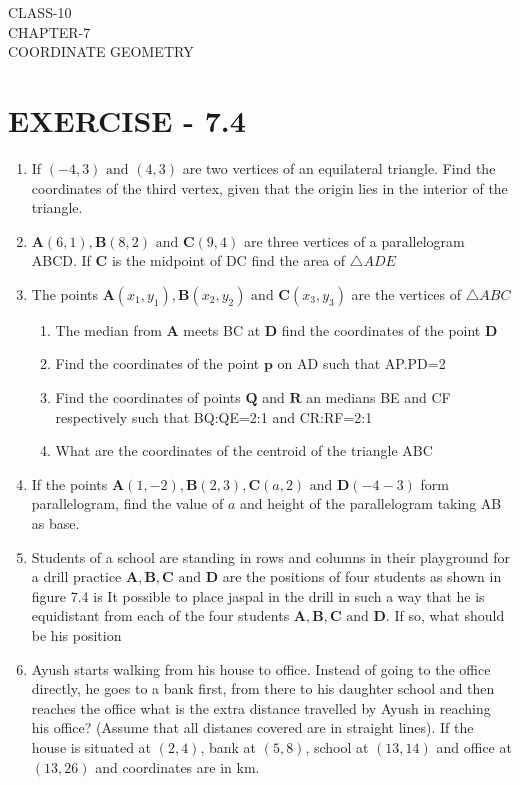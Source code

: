 \documentclass[12pt]{article}
\let\vec\mathbf
\begin{document}
\begin{center}
\textbf\large{CLASS-10\\CHAPTER-7 \\ COORDINATE GEOMETRY}
\end{center}

\section*{EXERCISE - 7.4}

\begin{enumerate}
\item If $(-4,3)\text{ and }(4,3)$ are two vertices of an equilateral triangle. Find the coordinates of the third vertex, given that the origin lies in the interior of the triangle. 
\item $\vec{A} (6,1),\vec{B}(8,2) \text{ and } \vec{C}(9,4)$ are three vertices of a parallelogram ABCD. If $\vec{C}$ is the midpoint of DC find the area of $\triangle ADE$
\item The points $\vec{A} (x_1,y_1),\vec{B}(x_2,y_2)\text{ and } \vec{C} (x_3,y_3) $ are the vertices of $\triangle ABC$
	\begin{enumerate}	
		\item The median from $\vec{A}$ meets BC at $\vec{D}$ find the coordinates of the point $\vec{D}$
		\item Find the coordinates of the point $\vec{p}$ on AD such that AP.PD=2
\item Find the coordinates of points $\vec{Q}$ and $\vec{R}$ an medians BE and CF respectively such that BQ:QE=2:1 and CR:RF=2:1
\item What are the coordinates of the centroid of the triangle ABC
	\end{enumerate}
\item If the points  $\vec{A}(1,-2), \vec{B}(2,3) , \vec{C}(a,2)\text{ and }\vec{D} (-4-3)$ form parallelogram, find the value of $a$ and height of the parallelogram taking AB as base.
\item Students of a school are standing in rows and columns in their playground for a drill practice $\vec{A},\vec{B},\vec{C} \text{ and } \vec{D}$ are the positions of four students as shown in figure 7.4 is It possible to place jaspal in the drill in such a way that he is equidistant from each of the four students $\vec{A},\vec{B},\vec{C} \text{ and } \vec{D}$. If so, what should be his position 
\item Ayush starts walking from his house to office. Instead of going to the office directly, he goes to a bank first, from there to his daughter school and then reaches the office what is the extra distance travelled by Ayush in reaching his office? (Assume that all distanes covered are in straight lines). If the house is situated at $(2,4)$, bank at $(5,8)$, school at $(13,14)$ and office at $(13,26)$ and coordinates are in km.


\end{enumerate}
\end{document}
